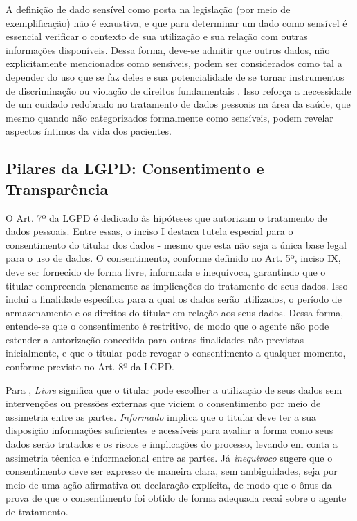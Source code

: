 A definição de dado sensível como posta na legislação (por meio de exemplificação) não é exaustiva, e que para determinar um dado como sensível é essencial verificar o contexto de sua utilização e sua relação com outras informações disponíveis. Dessa forma, deve-se admitir que outros dados, não explicitamente mencionados como sensíveis, podem ser considerados como tal a depender do uso que se faz deles e sua potencialidade de se tornar instrumentos de discriminação ou violação de direitos fundamentais \cite{TefferViola2020}. Isso reforça a necessidade de um cuidado redobrado no tratamento de dados pessoais na área da saúde, que mesmo quando não categorizados formalmente como sensíveis, podem revelar aspectos íntimos da vida dos pacientes.

\subsection{Pilares da LGPD: Consentimento e Transparência}
\label{subsec:fund-consentimento}
O Art. 7º da LGPD é dedicado às hipóteses que autorizam o tratamento de dados pessoais. Entre essas, o inciso I destaca tutela especial para o consentimento do titular dos dados - mesmo que esta não seja a única base legal para o uso de dados. O consentimento, conforme definido no Art. 5º, inciso IX, deve ser fornecido de forma livre, informada e inequívoca, garantindo que o titular compreenda plenamente as implicações do tratamento de seus dados. Isso inclui a finalidade específica para a qual os dados serão utilizados, o período de armazenamento e os direitos do titular em relação aos seus dados. Dessa forma, entende-se que o consentimento é restritivo, de modo que o agente não pode estender a autorização concedida para outras finalidades não previstas inicialmente, e que o titular pode revogar o consentimento a qualquer momento, conforme previsto no Art. 8º da LGPD.

Para , \textit{Livre} significa que o titular pode escolher a utilização de seus dados sem intervenções ou pressões externas que viciem o consentimento por meio de assimetria entre as partes. \textit{Informado} implica que o titular deve ter a sua disposição informações suficientes e acessíveis para avaliar a forma como seus dados serão tratados e os riscos e implicações do processo, levando em conta a assimetria técnica e informacional entre as partes. Já \textit{inequívoco} sugere que o consentimento deve ser expresso de maneira clara, sem ambiguidades, seja por meio de uma ação afirmativa ou declaração explícita, de modo que o ônus da prova de que o consentimento foi obtido de forma adequada recai sobre o agente de tratamento.

